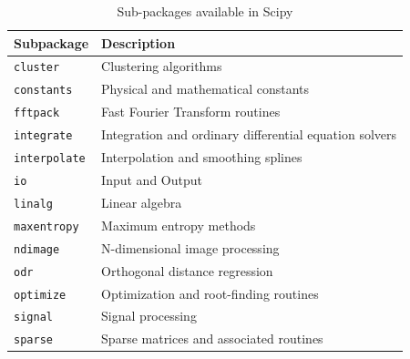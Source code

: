 \documentclass{article}
\begin{document}
\begin{table}
  \caption{Sub-packages available in Scipy}
  \label{subpkg}
\begin{tabular}{|l|l|}
\hline

\textbf{Subpackage} & \textbf{Description}\\

\hline

\texttt{cluster} & Clustering algorithms\\

\hline

\texttt{constants} & Physical and mathematical constants\\

\hline

\texttt{fftpack} & Fast Fourier Transform routines\\

\hline

\texttt{integrate} & Integration and ordinary differential equation
solvers\\

\hline

\texttt{interpolate} & Interpolation and smoothing splines\\

\hline

\texttt{io} & Input and Output\\

\hline

\texttt{linalg} & Linear algebra\\

\hline

\texttt{maxentropy} & Maximum entropy methods\\

\hline

\texttt{ndimage} & N-dimensional image processing\\

\hline

\texttt{odr} & Orthogonal distance regression\\

\hline

\texttt{optimize} & Optimization and root-ﬁnding routines\\

\hline

\texttt{signal} & Signal processing\\

\hline

\texttt{sparse} & Sparse matrices and associated routines\\


\end{tabular}
\end{table}
\end{document}
